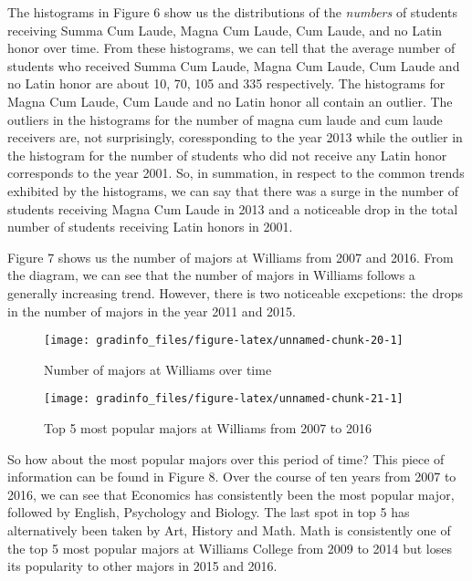 The histograms in Figure 6 show us the distributions of the
\emph{numbers} of students receiving Summa Cum Laude, Magna Cum Laude,
Cum Laude, and no Latin honor over time. From these histograms, we can
tell that the average number of students who received Summa Cum Laude,
Magna Cum Laude, Cum Laude and no Latin honor are about 10, 70, 105 and
335 respectively. The histograms for Magna Cum Laude, Cum Laude and no
Latin honor all contain an outlier. The outliers in the histograms for
the number of magna cum laude and cum laude receivers are, not
surprisingly, coressponding to the year 2013 while the outlier in the
histogram for the number of students who did not receive any Latin honor
corresponds to the year 2001. So, in summation, in respect to the common
trends exhibited by the histograms, we can say that there was a surge in
the number of students receiving Magna Cum Laude in 2013 and a
noticeable drop in the total number of students receiving Latin honors
in 2001.

\newpage

Figure 7 shows us the number of majors at Williams from 2007 and 2016.
From the diagram, we can see that the number of majors in Williams
follows a generally increasing trend. However, there is two noticeable
excpetions: the drops in the number of majors in the year 2011 and 2015.

\begin{Schunk}
\begin{figure}

{\centering \texttt{[image: gradinfo\_files/figure-latex/unnamed-chunk-20-1]} 

}

\caption[Number of majors at Williams over time]{Number of majors at Williams over time}\label{fig:unnamed-chunk-20}
\end{figure}
\end{Schunk}\begin{Schunk}
\begin{figure}

{\centering \texttt{[image: gradinfo\_files/figure-latex/unnamed-chunk-21-1]} 

}

\caption[Top 5 most popular majors at Williams from 2007 to 2016]{Top 5 most popular majors at Williams from 2007 to 2016}\label{fig:unnamed-chunk-21}
\end{figure}
\end{Schunk}

So how about the most popular majors over this period of time? This
piece of information can be found in Figure 8. Over the course of ten
years from 2007 to 2016, we can see that Economics has consistently been
the most popular major, followed by English, Psychology and Biology. The
last spot in top 5 has alternatively been taken by Art, History and
Math. Math is consistently one of the top 5 most popular majors at
Williams College from 2009 to 2014 but loses its popularity to other
majors in 2015 and 2016.

